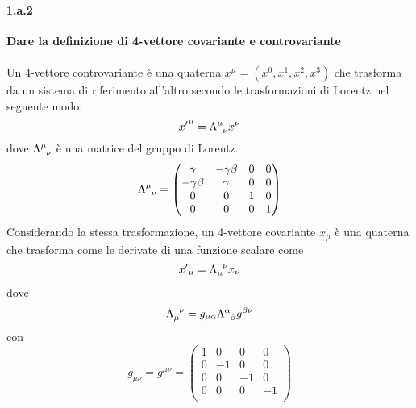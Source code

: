 \documentclass[twoside]{article}
\begin{document}
\paragraph{1.a.2} \textbf{Dare la definizione di 4-vettore covariante e controvariante}\\
\\
Un 4-vettore controvariante è una quaterna $x^{\mu}=(x^0,x^1,x^2,x^3)$ che trasforma da un sistema di riferimento all'altro secondo le trasformazioni di Lorentz nel seguente modo:
\begin{equation*}
    {x'}^{\mu}=\tensor{\Lambda}{^{\mu}_{\nu}}x^{\nu}
\end{equation*}
dove $\tensor{\Lambda}{^{\mu}_{\nu}}$ è una matrice del gruppo di Lorentz. 
\[
\tensor{\Lambda}{^{\mu}_{\nu}}=\begin{pmatrix}
\gamma & -\gamma\beta & 0 & 0 \\
-\gamma\beta & \gamma & 0 & 0 \\
0 & 0 & 1 & 0 \\
0 & 0 & 0 & 1 \\
\end{pmatrix}
\]
Considerando la stessa trasformazione, un 4-vettore covariante $x_{\mu}$ è una quaterna che trasforma come le derivate di una funzione scalare come 
\begin{equation*}
    {x'}_{\mu}=\tensor{\Lambda}{_{\mu}^{\nu}}x_{\nu}
\end{equation*}
dove
\begin{equation*}
    \tensor{\Lambda}{_{\mu}^{\nu}}=g_{\mu\alpha}\tensor{\Lambda}{^{\alpha}_{\beta}}g^{\beta\nu}
\end{equation*}
con 
\[
g_{\mu\nu}=g^{\mu\nu}=\begin{pmatrix}
1 & 0 & 0 & 0 \\
0 & -1 & 0 & 0 \\
0 & 0 & -1 & 0 \\
0 & 0 & 0 & -1 \\
\end{pmatrix}
\]
\end{document}
